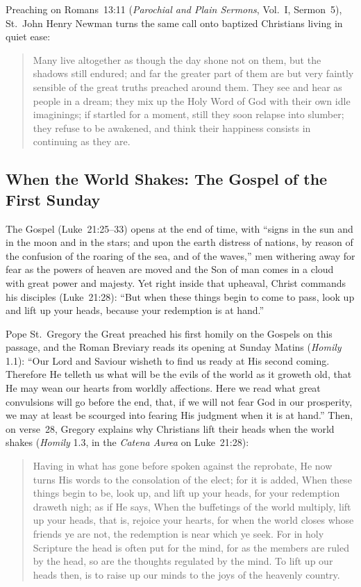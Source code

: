 Preaching on Romans~13:11 (\textit{Parochial and Plain Sermons}, Vol.~I,
Sermon~5), St.~John Henry Newman turns the same call onto baptized
Christians living in quiet ease:

\begin{quote}
Many live altogether as though the day shone not on them, but the
shadows still endured; and far the greater part of them are but very
faintly sensible of the great truths preached around them. They see and
hear as people in a dream; they mix up the Holy Word of God with their
own idle imaginings; if startled for a moment, still they soon relapse
into slumber; they refuse to be awakened, and think their happiness
consists in continuing as they are.
\end{quote}

\subsection{When the World Shakes: The Gospel of the First Sunday}

The Gospel (Luke~21:25--33) opens at the end of time, with ``signs in
the sun and in the moon and in the stars; and upon the earth distress of
nations, by reason of the confusion of the roaring of the sea, and of
the waves,'' men withering away for fear as the powers of heaven are
moved and the Son of man comes in a cloud with great power and majesty.
Yet right inside that upheaval, Christ commands his disciples
(Luke~21:28): ``But when these things begin to come to pass, look up and
lift up your heads, because your redemption is at hand.''

Pope St.~Gregory the Great preached his first homily on the Gospels on
this passage, and the Roman Breviary reads its opening at Sunday Matins
(\textit{Homily} 1.1): ``Our Lord and Saviour wisheth to find us ready
at His second coming. Therefore He telleth us what will be the evils of
the world as it groweth old, that He may wean our hearts from worldly
affections. Here we read what great convulsions will go before the end,
that, if we will not fear God in our prosperity, we may at least be
scourged into fearing His judgment when it is at hand.'' Then, on
verse~28, Gregory explains why Christians lift their heads when the
world shakes (\textit{Homily} 1.3, in the \textit{Catena Aurea} on
Luke~21:28):

\begin{quote}
Having in what has gone before spoken against the reprobate, He now
turns His words to the consolation of the elect; for it is added, When
these things begin to be, look up, and lift up your heads, for your
redemption draweth nigh; as if He says, When the buffetings of the world
multiply, lift up your heads, that is, rejoice your hearts, for when the
world closes whose friends ye are not, the redemption is near which ye
seek. For in holy Scripture the head is often put for the mind, for as
the members are ruled by the head, so are the thoughts regulated by the
mind. To lift up our heads then, is to raise up our minds to the joys of
the heavenly country.
\end{quote}

